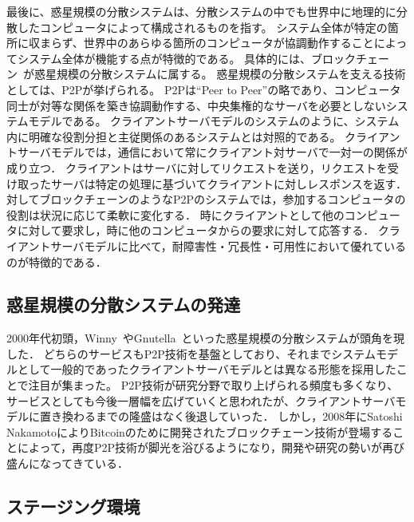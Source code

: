 最後に、惑星規模の分散システムは、分散システムの中でも世界中に地理的に分散したコンピュータによって構成されるものを指す。
システム全体が特定の箇所に収まらず、世界中のあらゆる箇所のコンピュータが協調動作することによってシステム全体が機能する点が特徴的である。
具体的には、ブロックチェーン~\cite{Bitcoin}が惑星規模の分散システムに属する。
惑星規模の分散システムを支える技術としては、P2Pが挙げられる。
P2Pは``Peer to Peer''の略であり、コンピュータ同士が対等な関係を築き協調動作する、中央集権的なサーバを必要としないシステムモデルである。
クライアントサーバモデルのシステムのように、システム内に明確な役割分担と主従関係のあるシステムとは対照的である。
クライアントサーバモデルでは，通信において常にクライアント対サーバで一対一の関係が成り立つ．
クライアントはサーバに対してリクエストを送り，リクエストを受け取ったサーバは特定の処理に基づいてクライアントに対しレスポンスを返す．
対してブロックチェーンのようなP2Pのシステムでは，参加するコンピュータの役割は状況に応じて柔軟に変化する．
時にクライアントとして他のコンピュータに対して要求し，時に他のコンピュータからの要求に対して応答する．
クライアントサーバモデルに比べて，耐障害性・冗長性・可用性において優れているのが特徴的である．

\subsection{惑星規模の分散システムの発達}

2000年代初頭，Winny~\cite{Winny}やGnutella~\cite{Gnutella}といった惑星規模の分散システムが頭角を現した．
どちらのサービスもP2P技術を基盤としており、それまでシステムモデルとして一般的であったクライアントサーバモデルとは異なる形態を採用したことで注目が集まった。
P2P技術が研究分野で取り上げられる頻度も多くなり、サービスとしても今後一層幅を広げていくと思われたが、クライアントサーバモデルに置き換わるまでの隆盛はなく後退していった．
しかし，2008年にSatoshi NakamotoによりBitcoinのために開発されたブロックチェーン技術が登場することによって，再度P2P技術が脚光を浴びるようになり，開発や研究の勢いが再び盛んになってきている．

\subsection{ステージング環境}

